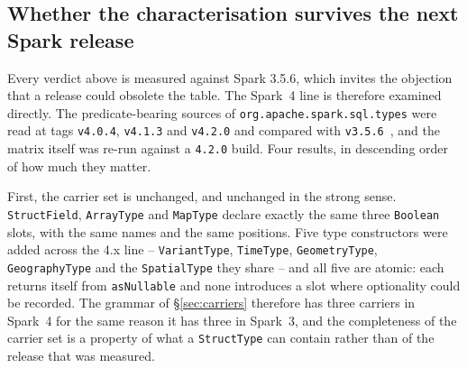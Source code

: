 \subsection{Whether the characterisation survives the next Spark release}
\label{sec:spark4}

Every verdict above is measured against Spark 3.5.6, which invites the objection that a release could obsolete the table. The Spark~4 line is therefore examined directly. The predicate-bearing sources of \texttt{org.apache.spark.sql.types} were read at tags \texttt{v4.0.4}, \texttt{v4.1.3} and \texttt{v4.2.0} and compared with \texttt{v3.5.6}~\cite{spark_source_datatype, spark_source_datatype_42}, and the matrix itself was re-run against a \texttt{4.2.0} build. Four results, in descending order of how much they matter.

First, the carrier set is unchanged, and unchanged in the strong sense. \texttt{StructField}, \texttt{ArrayType} and \texttt{MapType} declare exactly the same three \texttt{Boolean} slots, with the same names and the same positions. Five type constructors were added across the 4.x line -- \texttt{VariantType}, \texttt{TimeType}, \texttt{GeometryType}, \texttt{GeographyType} and the \texttt{SpatialType} they share -- and all five are atomic: each returns itself from \texttt{asNullable} and none introduces a slot where optionality could be recorded. The grammar of \S\ref{sec:carriers} therefore has three carriers in Spark~4 for the same reason it has three in Spark~3, and the completeness of the carrier set is a property of what a \texttt{StructType} can contain rather than of the release that was measured.

